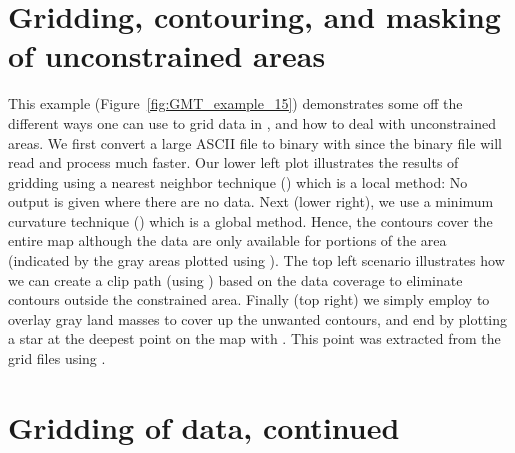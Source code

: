 

\section{Gridding, contouring, and masking of unconstrained areas}
\label{sec:example_15}

This example (Figure~\ref{fig:GMT_example_15}) demonstrates
some off the different ways one
can use to grid data in \GMT, and how to deal with unconstrained
areas.  We first convert a large ASCII file to binary with
 since the binary file will read and process
much faster.  Our lower left plot illustrates the results of
gridding using a nearest neighbor technique ()
which is a local method: No output is given where there are no data.
Next (lower right), we use a minimum curvature technique
() which is a global method.  Hence, the contours
cover the entire map although the data are only available for
portions of the area (indicated by the gray areas plotted using
).  The top left scenario illustrates how we can
create a clip path (using ) based on the data coverage
to eliminate contours outside the constrained area.
Finally (top right) we simply employ  to overlay
gray land masses to cover up the unwanted contours, and end by
plotting a star at the deepest point on the map with .
This point was extracted from the grid files using .



\section{Gridding of data, continued}

